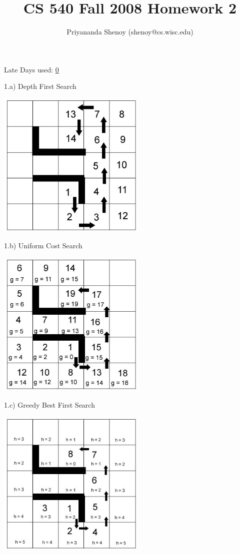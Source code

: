 \documentclass[11pt]{article}
\author{Priyananda Shenoy (shenoy@cs.wisc.edu)}
\title{
	CS 540 Fall 2008 Homework 2
}
\begin{document}
\maketitle
\begin{center}
	Late Days used: \underline{0}
\end{center}
\newpage

1.a) Depth First Search

{\center \includegraphics[width=200pt,height=200pt]{q1-dfs.jpg} }

\newpage

1.b) Uniform Cost Search

{\center \includegraphics[width=200pt,height=200pt]{q1-ucs.jpg} }

\newpage

1.c) Greedy Best First Search

{\center \includegraphics[width=200pt,height=200pt]{q1-gbfs.jpg} }
\end{document}
